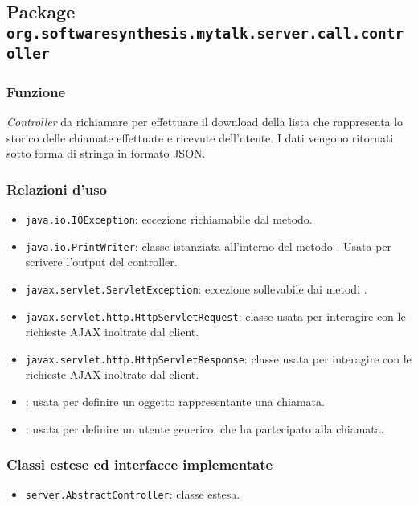 \subsection{Package \texttt{org.softwaresynthesis.mytalk.server.call.controller}}\label{sec:callServlet}


\subsubsection*{Funzione}
\textit{Controller} da richiamare per effettuare il download della lista che rappresenta lo storico delle chiamate effettuate e ricevute dell'utente. I dati vengono ritornati sotto forma di stringa in formato JSON.

\subsubsection*{Relazioni d'uso}
\begin{itemize}
	\item \texttt{java.io.IOException}: eccezione richiamabile dal metodo.
	\item \texttt{java.io.PrintWriter}: classe istanziata all'interno del metodo . Usata per scrivere l'output del controller.
	\item \texttt{javax.servlet.ServletException}: eccezione sollevabile dai metodi .
	\item \texttt{javax.servlet.http.HttpServletRequest}: classe usata per interagire con le richieste AJAX inoltrate dal client.
	\item \texttt{javax.servlet.http.HttpServletResponse}: classe usata per interagire con le richieste AJAX inoltrate dal client.
	\item {}: usata per definire un oggetto rappresentante una chiamata.
	\item {}: usata per definire un utente generico, che ha partecipato alla chiamata.
\end{itemize}

\subsubsection*{Classi estese ed interfacce implementate}
\begin{itemize}
	\item \texttt{server.AbstractController}: classe estesa.
\end{itemize}

